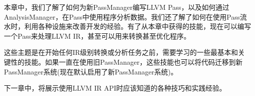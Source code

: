 本章中，我们了解了如何为新PassManager编写LLVM Pass，以及如何通过AnalysisManager，在Pass中使用程序分析数据。我们还了解了如何在使用Pass流水时，利用各种设施来改善开发的经验。有了从本章中获得的技能，现在可以编写一个Pass来处理LLVM IR，甚至可以用来转换甚至优化程序。

这些主题是在开始任何IR级别转换或分析任务之前，需要学习的一些最基本和关键性的技能。如果一直在使用旧PassManager，这些技能也可以将代码迁移到新PassManager系统(现在默认启用了新PassManager系统)。

下一章中，将展示使用LLVM IR API时应该知道的各种技巧和实践经验。











